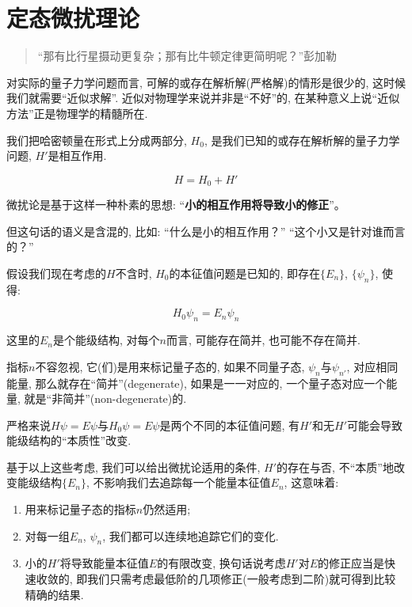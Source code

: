 \section{定态微扰理论}

\begin{quotation}
``那有比行星摄动更复杂；那有比牛顿定律更简明呢？''\qquad 彭加勒
\end{quotation}

对实际的量子力学问题而言, 可解的或存在解析解(严格解)的情形是很少的,
这时候我们就需要``近似求解''. 近似对物理学来说并非是``不好''的,
在某种意义上说``近似方法''正是物理学的精髓所在.

我们把哈密顿量在形式上分成两部分, $H_0$,
是我们已知的或存在解析解的量子力学问题, $H'$是相互作用.

\begin{equation}\label{Full Hamiltonian}
H = H_0 + H'
\end{equation}

微扰论是基于这样一种朴素的思想:
``\textbf{小的相互作用将导致小的修正}''。

但这句话的语义是含混的, 比如: ``什么是小的相互作用？''
``这个小又是针对谁而言的？''

假设我们现在考虑的$H$不含时, $H_0$的本征值问题是已知的,
即存在$\{E_n\}$, $\{\psi_n\}$, 使得:

\begin{equation}\label{original eigenvalue problem H0}
H_0 \psi_n = E_n \psi_n
\end{equation}

这里的$E_n$是个能级结构, 对每个$n$而言, 可能存在简并,
也可能不存在简并.

指标$n$不容忽视, 它(们)是用来标记量子态的, 如果不同量子态,
$\psi_n$与$\psi_{n'}$, 对应相同能量, 那么就存在``简并''(degenerate),
如果是一一对应的, 一个量子态对应一个能量,
就是``非简并''(non-degenerate)的.

严格来说$H\psi=E\psi$与$H_0\psi=E\psi$是两个不同的本征值问题,
有$H'$和无$H'$可能会导致能级结构的``本质性''改变.

基于以上这些考虑, 我们可以给出微扰论适用的条件, $H'$的存在与否,
不``本质''地改变能级结构$\{E_n\}$,
不影响我们去追踪每一个能量本征值$E_n$, 这意味着:

\begin{enumerate}
  \item 用来标记量子态的指标$n$仍然适用;
  \item 对每一组$E_n$, $\psi_n$, 我们都可以连续地追踪它们的变化.
  \item 小的$H'$将导致能量本征值$E$的有限改变,
  换句话说考虑$H'$对$E$的修正应当是快速收敛的,
  即我们只需考虑最低阶的几项修正(一般考虑到二阶)就可得到比较精确的结果.
\end{enumerate}

